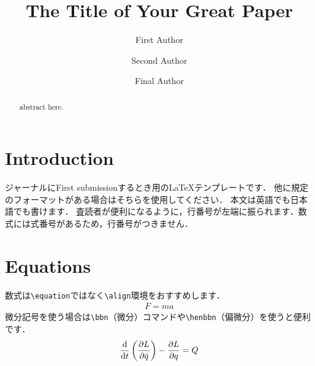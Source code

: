 \documentclass[a4j,10pt,english]{jsarticle}
\newcommand{\bbn}[2]{\frac{{\rm d} #1}{{\rm d} #2}} %
\newcommand{\henbbn}[2]{\frac{\partial #1}{\partial #2}}    %
\begin{document}
\title{The Title of Your Great Paper
}

\author[1]{First Author}
\author[2]{Second Author}
\author[1]{Final Author}


\date{} %

\setlength{\baselineskip}{4.4mm}	%
\maketitle
{} %


\begin{abstract}
	abstract here.
\end{abstract}

\section{Introduction}
ジャーナルにFirst submissionするとき用の\LaTeX テンプレートです．
他に規定のフォーマットがある場合はそちらを使用してください．
本文は英語でも日本語でも書けます．
査読者が便利になるように，行番号が左端に振られます．数式には式番号があるため，行番号がつきません．

\section{Equations}
数式は{\tt \textbackslash equation}ではなく{\tt \textbackslash align}環境をおすすめします．
\begin{align}
  F=ma
\end{align}
微分記号を使う場合は{\tt \textbackslash bbn}（微分）コマンドや{\tt \textbackslash henbbn}（偏微分）を使うと便利です．
\begin{align}
  \bbn{}{t}\left( \henbbn{L}{\dot{q}} \right) - \henbbn{L}{q} = Q
\end{align}
\end{document}
